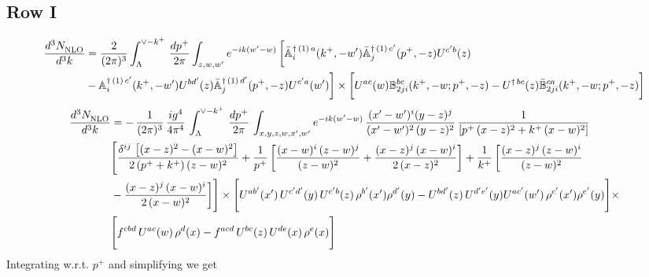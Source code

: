 \documentclass[9pt]{article}
\def\mf#1{\mathbb{#1}}
\numberwithin{equation}{section}
\begin{document}
\subsection{Row I\, }
\begin{align}
 \frac{d^{3}N_{\rm NLO}^{\rm}}{d^{3}k}  & =    \frac{2}{(2\pi)^{3}} \int_{\Lambda}^{\vee - k^{+}}\, \frac{dp^{+}}{2\pi}\int_{z,w,w^{\prime}} e^{-ik(w^{\prime}-w)}\, 
        \bigg[\Bar{\mf{A}}^{\dagger\, (1)\, a}_{i}(k^{+},-w^{\prime})\Bar{\mf{A}}^{\dagger\, (1)\, c^{\prime}}_{j}(p^{+},-z)U^{c^{\prime}b}(z)\notag \\ & -\mf{A}^{\dagger\, (1)\, c^{\prime}}_{i}(k^{+},- w^{\prime})U^{bd^{\prime}}(z)\Bar{\mf{A}}^{\dagger\, (1)\, d^{\prime}}_{j}(p^{+},-z)U^{c^{\prime}a}(w^{\prime})  \bigg]\times \bigg[U^{ac}(w) \mf{B}^{bc}_{2ji}(k^{+},-w;p^{+},-z) -U^{\dagger\, bc}(z)\Bar{\mf{B}}^{ca}_{2ji}(k^{+},-w; p^{+},-z)\bigg] \nonumber
\end{align}
\begin{align}
    \frac{d^{3}N_{\rm NLO}^{\rm}}{d^{3}k}  & =  -\,\frac{1}{(2\pi)^{3}}\,\frac{ig^{4}}{4\pi^{4}}\, \int_{\Lambda}^{\vee-k^{+}}\, \frac{dp^{+}}{2\pi}\, \int_{x,y,z,w,x',w^{\prime}} e^{-ik(w^{\prime}-w)}\, \frac{(x'-w')^{i}(y-z)^{j}}{(x'-w')^{2}\,(y-z)^{2}}\, \frac{1}{\left[p^{+}\,(x-z)^{2}+k^{+}\,(x-w)^{2}\right]}\notag \\ & \Bigg[\frac{\delta^{ij}\, \left[(x-z)^{2}-(x-w)^{2}\right]}{2\, (p^{+}+k^{+})\,(z-w)^{2}}+\frac{1}{p^{+}}\, \bigg[\frac{(x-w)^{i}\,(z-w)^{j}}{(z-w)^{2}}+\frac{(x-z)^{j}\,(x-w)^{i}}{2\,(x-z)^{2}}\bigg]+\frac{1}{k^{+}}\,\bigg[\frac{(x-z)^{j}\,(z-w)^{i}}{(z-w)^{2}}\notag \\ & -\frac{(x-z)^{j}\,(x-w)^{i}}{2\,(x-w)^{2}}\bigg]\Bigg]\times \Bigg[U^{ab'}(x')\,U^{c'd'}(y)\,U^{c'b}(z)\,\rho^{b'}(x')\rho^{d'}(y)-U^{bd'}(z)\,U^{d'e'}(y)U^{ac'}(w')\,\rho^{c'}(x')\rho^{e'}(y)\Bigg]\times \notag \\ & \Bigg[f^{cbd}\,U^{ac}(w)\,\rho^{d}(x)-f^{acd}\, U^{bc}(z)\,U^{de}(x)\,\rho^{e}(x)\Bigg]
\end{align}
Integrating w.r.t. $p^{+}$ and simplifying we get
\end{document}
